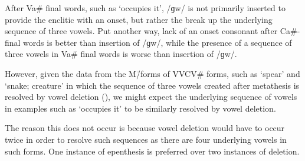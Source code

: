 After Va{\#} final words, such as 
 `occupies it',
/ɡw/ is not primarily inserted to provide the enclitic with an onset,
but rather the break up the underlying sequence of three vowels.
Put another way, lack of an onset consonant
after Ca{\#}-final words is better than insertion of /ɡw/,
while the presence of a sequence of three
vowels in Va{\#} final words is worse than insertion of /ɡw/. 

However, given the data from the M\=/forms of VVCV{\#} forms,
such as  {\ra}  `spear'
and  {\ra}  `snake; creature'
in which the sequence of three vowels created after metathesis
is resolved by vowel deletion (),
we might expect the underlying sequence of vowels
in examples such as  {\ra}  `occupies it'
to be similarly resolved by vowel deletion.

The reason this does not occur
is because vowel deletion would have to occur
twice in order to resolve such sequences
as there are four underlying vowels in such forms.
One instance of epenthesis is preferred over two instances of deletion.

